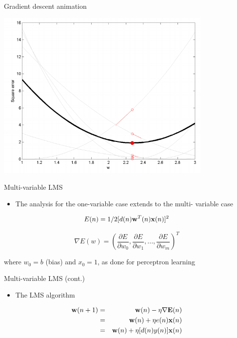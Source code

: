 \documentclass[notes]{beamer}
\providecommand{\tightlist}{%
  \setlength{\itemsep}{0pt}\setlength{\parskip}{0pt}}
\begin{document}
\begin{frame}{Gradient descent animation}

\centering 

\includegraphics[width=0.80000\textwidth]{2018-03-10-10-01-33.png}\\

\end{frame}

\begin{frame}{Multi-variable LMS}

\begin{itemize}
\tightlist
\item
  The analysis for the one-variable case extends to the multi- variable
  case
\end{itemize}

\[ E ( n ) = 1/2 [d ( n )  \mathbf{w}^ T ( n )\mathbf{x}( n )]^2 \]

\[  \nabla  E( w ) = \left(  \frac{\partial E}{\partial w_0}  ,  \frac{\partial E}{\partial w_1}  ,...,   \frac{\partial E}{\partial w_m} \right)^T \]

where \(w_0= b\) (bias) and \(x_0 = 1\), as done for perceptron learning

\end{frame}

\begin{frame}{Multi-variable LMS (cont.)}

\begin{itemize}
\tightlist
\item
  The LMS algorithm
\end{itemize}

\begin{eqnarray*}
    \mathbf{w} ( n + 1)& =& \mathbf{w} ( n )-\eta \nabla  \mathbf{E}( n ) \\ 
    &= &\mathbf{w} ( n ) + \eta e( n )\mathbf{x}( n )\\
    &= &\mathbf{w} ( n ) + \eta [d ( n )  y ( n )]\mathbf{x}( n ) 
\end{eqnarray*}

\end{frame}
\end{document}
